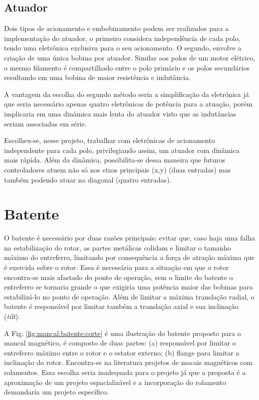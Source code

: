 \subsection{Atuador}

Dois tipos de acionamento e embobinamento podem ser realizados para a implementação do atuador, o primeiro considera independência de cada polo, tendo uma eletrônica exclusiva para o seu acionamento. O segundo, envolve a criação de uma única bobina por atuador. Similar aos polos de um motor elétrico, o mesmo filamento é compartilhado entre  o polo primário e os polos secundários resultando em uma bobina de maior resistência e indutância. 

A vantagem da escolha do segundo método seria a simplificação da eletrônica já que seria necessário apenas quatro eletrônicas de potência para a atuação, porém implicaria em uma dinâmica mais lenta do atuador visto que as indutâncias seriam associadas em série.

Escolheu-se, nesse projeto, trabalhar com eletrônicas de acionamento independente para cada polo, privilegiando assim, um atuador com dinâmica mais rápida. Além da dinâmica, possibilita-se dessa maneira que futuros controladores atuem não só nos eixos principais (x,y) (duas entradas) mas também podendo atuar na diagonal (quatro entradas). 

\section{Batente}

 O batente é necessário por duas razões principais: evitar que, caso haja uma falha na estabilização do rotor, as partes metálicas colidam e limitar o tamanho máximo do entreferro, limitando por consequência a força de atração máxima que é exercida sobre o rotor.  Essa é necessária para a situação em que o rotor encontra-se mais afastado do ponto de operação, sem o limite do batente o entreferro se tornaria grande o que exigiria uma potência maior das bobinas para estabilizá-lo no ponto de operação.  Além de limitar a máxima translação radial, o batente é responsável por limitar também a translação axial e sua inclinação (\textit{tilt}).
 
 A Fig. \ref{fig:mancal:batente:corte} é uma ilustração do batente proposto para o mancal magnético, é composto de duas partes: (a) responsável por limitar o entreferro máximo entre o rotor e o estator externo; (b) flange para limitar a inclinação do rotor. Encontra-se na literatura projetos de macais magnéticos com rolamentos. Essa escolha seria inadequada para o projeto já que a proposta é a aproximação de um projeto espacializável e a incorporação do rolamento demandaria um projeto específico.
 
